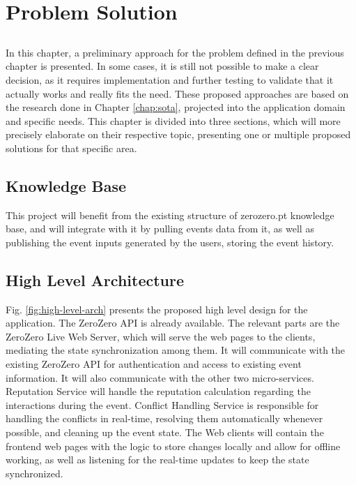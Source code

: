 \chapter{Problem Solution}\label{chap:problem-solution}

\section*{}

In this chapter, a preliminary approach for the problem defined in the previous chapter is presented. In some cases, it is still not possible to make a clear decision, as it requires implementation and further testing to validate that it actually works and really fits the need. These proposed approaches are based on the research done in Chapter \ref{chap:sota}, projected into the application domain and specific needs. This chapter is divided into three sections, which will more precisely elaborate on their respective topic, presenting one or multiple proposed solutions for that specific area. 

\section{Knowledge Base}
This project will benefit from the existing structure of zerozero.pt knowledge base, and will integrate with it by pulling events data from it, as well as publishing the event inputs generated by the users, storing the event history.

\section{High Level Architecture}

Fig. \ref{fig:high-level-arch} presents the proposed high level design for the application. The ZeroZero API is already available. The relevant parts are the ZeroZero Live Web Server, which will serve the web pages to the clients, mediating the state synchronization among them. It will communicate with the existing ZeroZero API for authentication and access to existing event information. It will also communicate with the other two micro-services. Reputation Service will handle the reputation calculation regarding the interactions during the event. Conflict Handling Service is responsible for handling the conflicts in real-time, resolving them automatically whenever possible, and cleaning up the event state. The Web clients will contain the frontend web pages with the logic to store changes locally and allow for offline working, as well as listening for the real-time updates to keep the state synchronized.

